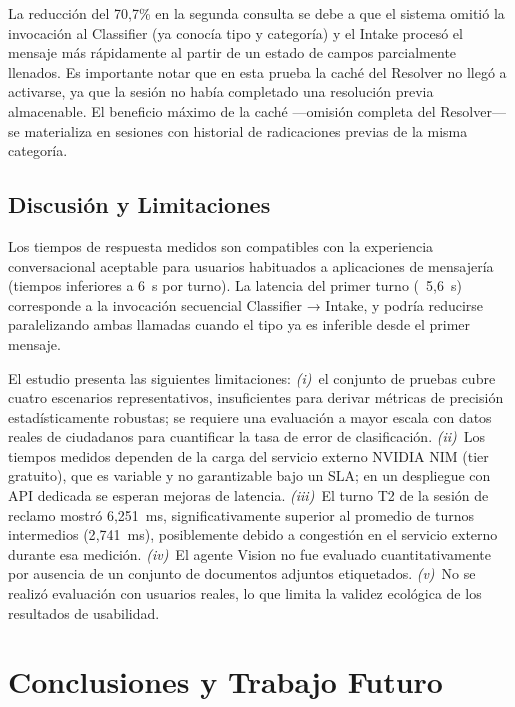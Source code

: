 \documentclass[runningheads]{llncs}
\begin{document}
La reducción del 70{,}7\% en la segunda consulta se debe a que el sistema omitió la invocación al Classifier (ya conocía tipo y categoría) y el Intake procesó el mensaje más rápidamente al partir de un estado de campos parcialmente llenados. Es importante notar que en esta prueba la caché del Resolver no llegó a activarse, ya que la sesión no había completado una resolución previa almacenable. El beneficio máximo de la caché —omisión completa del Resolver— se materializa en sesiones con historial de radicaciones previas de la misma categoría.

\subsection{Discusión y Limitaciones}

Los tiempos de respuesta medidos son compatibles con la experiencia conversacional aceptable para usuarios habituados a aplicaciones de mensajería (tiempos inferiores a 6~s por turno). La latencia del primer turno (~5{,}6~s) corresponde a la invocación secuencial Classifier → Intake, y podría reducirse paralelizando ambas llamadas cuando el tipo ya es inferible desde el primer mensaje.

El estudio presenta las siguientes limitaciones: \textit{(i)}~el conjunto de pruebas cubre cuatro escenarios representativos, insuficientes para derivar métricas de precisión estadísticamente robustas; se requiere una evaluación a mayor escala con datos reales de ciudadanos para cuantificar la tasa de error de clasificación. \textit{(ii)}~Los tiempos medidos dependen de la carga del servicio externo NVIDIA NIM (tier gratuito), que es variable y no garantizable bajo un SLA; en un despliegue con API dedicada se esperan mejoras de latencia. \textit{(iii)}~El turno T2 de la sesión de reclamo mostró 6{,}251~ms, significativamente superior al promedio de turnos intermedios (2{,}741~ms), posiblemente debido a congestión en el servicio externo durante esa medición. \textit{(iv)}~El agente Vision no fue evaluado cuantitativamente por ausencia de un conjunto de documentos adjuntos etiquetados. \textit{(v)}~No se realizó evaluación con usuarios reales, lo que limita la validez ecológica de los resultados de usabilidad.

\section{Conclusiones y Trabajo Futuro}
\label{sec:concl}
\end{document}
